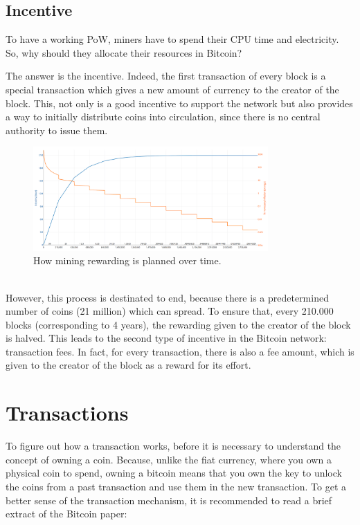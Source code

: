 \subsection{Incentive}
\label{sec:incentive}

To have a working PoW, miners have to spend their CPU time and electricity. So, why 
should they allocate their resources in Bitcoin?

The answer is the incentive. Indeed, the first transaction of every block is a special
transaction which gives a new amount of currency to the creator of the block. This, 
not only is a good incentive to support the network but also provides a way to initially 
distribute coins into circulation, since there is no central authority to issue them.
\begin{figure}[!h]
    \centering
    \includegraphics[width = 0.8\textwidth]{rewarding.png}
    \caption{How mining rewarding is planned over time.\cite{rewarding}}
    \label{fig:claim}
\end{figure}\\
However, this process is destinated to end, because there is a predetermined number
of coins (21 million) which can spread. To ensure that, every 210.000 blocks 
(corresponding to 4 years), the rewarding given to the creator of the block is halved.
This leads to the second type of incentive in the Bitcoin network: transaction fees.
In fact, for every transaction, there is also a fee amount, which is given to the 
creator of the block as a reward for its effort.




\section{Transactions}
\label{sec:transactions}

To figure out how a transaction works, before it is necessary to understand the concept of
owning a coin. Because, unlike the fiat currency, where you own a physical coin
to spend, owning a bitcoin means that you own the key to unlock the coins from a past
transaction and use them in the new transaction. To get a better sense of the 
transaction mechanism, it is recommended to read a brief extract of the Bitcoin paper: 

